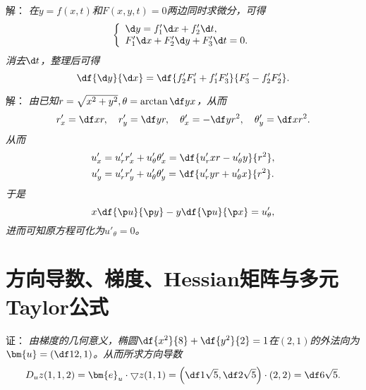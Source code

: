 \begin{frame}
	\linespread{1.5}

	\bigskip
	
	\small 解：\it
	在$y=f(x,t)$和$F(x,y,t)=0$两边同时求微分，可得
	$$
		\left\{\begin{array}{l}
			\d y=f'_1\d x+f'_2\d t,\\
			F'_1\d x+F'_2\d y+F'_3\d t=0.
		\end{array}\right.
	$$
	消去$\d t$，整理后可得
	$$\df{\d y}{\d x}=\df{f'_2F'_1+f'_1F'_3}{F'_3-f'_2F'_2}.$$\fin
	
\end{frame}

\begin{frame}
	\linespread{1.5}
	
	\small 解：\it
	由已知$r=\sqrt{x^2+y^2},\theta=\arctan\df yx$，从而
	$$
		r'_x=\df xr,\quad r'_y= \df yr,\quad
		\theta'_x=-\df y{r^2},\quad \theta'_y=\df x{r^2}. 
	$$
	从而
	\begin{align*}
		u'_x&=u'_rr'_x+u'_{\theta}\theta'_x=\df{u'_rxr-u'_{\theta}y}{r^2},\\
		u'_y&=u'_rr'_y+u'_{\theta}\theta'_y=\df{u'_ryr+u'_{\theta}x}{r^2}.
	\end{align*}
	于是
	$$x\df{\p u}{\p y}-y\df{\p u}{\p x}=u'_{\theta},$$
	进而可知原方程可化为$u'_{\theta}=0$。\fin
\end{frame}

\section{方向导数、梯度、Hessian矩阵与多元Taylor公式}

\begin{frame}
	\linespread{1.5}
	\pause

	\small 证：\it
	由梯度的几何意义，椭圆$\df{x^2}{8}+\df{y^2}{2}=1$在$(2,1)$的外法向为
	$\bm{u}=\left(\df12,1\right)$。从而所求方向导数
	$$D_uz(1,1,2)=\bm{e}_u\cdot\bigtriangledown z(1,1)
	=\left(\df1{\sqrt5},\df2{\sqrt5}\right)\cdot (2,2)=\df6{\sqrt5}.$$
	\fin
	
\end{frame}

